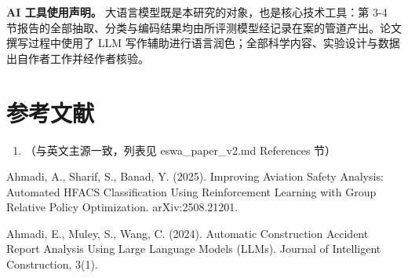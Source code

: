 \documentclass[11pt]{article}
\begin{document}
\textbf{AI {\cjkfont 工\allowbreak 具\allowbreak 使\allowbreak 用\allowbreak 声\allowbreak 明\allowbreak 。}} {\cjkfont 大\allowbreak 语\allowbreak 言\allowbreak 模\allowbreak 型\allowbreak 既\allowbreak 是\allowbreak 本\allowbreak 研\allowbreak 究\allowbreak 的\allowbreak 对\allowbreak 象\allowbreak ，\allowbreak 也\allowbreak 是\allowbreak 核\allowbreak 心\allowbreak 技\allowbreak 术\allowbreak 工\allowbreak 具\allowbreak ：\allowbreak 第} 3-4 {\cjkfont 节\allowbreak 报\allowbreak 告\allowbreak 的\allowbreak 全\allowbreak 部\allowbreak 抽\allowbreak 取\allowbreak 、\allowbreak 分\allowbreak 类\allowbreak 与\allowbreak 编\allowbreak 码\allowbreak 结\allowbreak 果\allowbreak 均\allowbreak 由\allowbreak 所\allowbreak 评\allowbreak 测\allowbreak 模\allowbreak 型\allowbreak 经\allowbreak 记\allowbreak 录\allowbreak 在\allowbreak 案\allowbreak 的\allowbreak 管\allowbreak 道\allowbreak 产\allowbreak 出\allowbreak 。\allowbreak 论\allowbreak 文\allowbreak 撰\allowbreak 写\allowbreak 过\allowbreak 程\allowbreak 中\allowbreak 使\allowbreak 用\allowbreak 了} LLM {\cjkfont 写\allowbreak 作\allowbreak 辅\allowbreak 助\allowbreak 进\allowbreak 行\allowbreak 语\allowbreak 言\allowbreak 润\allowbreak 色\allowbreak ；\allowbreak 全\allowbreak 部\allowbreak 科\allowbreak 学\allowbreak 内\allowbreak 容\allowbreak 、\allowbreak 实\allowbreak 验\allowbreak 设\allowbreak 计\allowbreak 与\allowbreak 数\allowbreak 据\allowbreak 出\allowbreak 自\allowbreak 作\allowbreak 者\allowbreak 工\allowbreak 作\allowbreak 并\allowbreak 经\allowbreak 作\allowbreak 者\allowbreak 核\allowbreak 验\allowbreak 。}

\section*{{\cjkfont 参\allowbreak 考\allowbreak 文\allowbreak 献}}
\begin{enumerate}
\item {\cjkfont （\allowbreak 与\allowbreak 英\allowbreak 文\allowbreak 主\allowbreak 源\allowbreak 一\allowbreak 致\allowbreak ，\allowbreak 列\allowbreak 表\allowbreak 见} eswa\_paper\_v2.md References {\cjkfont 节\allowbreak ）}
\end{enumerate}
Ahmadi, A., Sharif, S., Banad, Y. (2025). Improving Aviation Safety Analysis: Automated HFACS Classification Using Reinforcement Learning with Group Relative Policy Optimization. arXiv:2508.21201.

Ahmadi, E., Muley, S., Wang, C. (2024). Automatic Construction Accident Report Analysis Using Large Language Models (LLMs). Journal of Intelligent Construction, 3(1).
\end{document}
